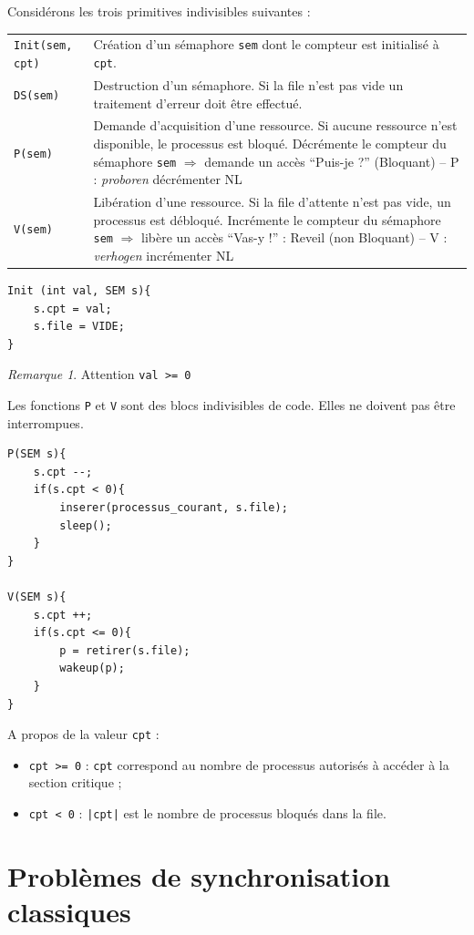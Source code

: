 \documentclass[11pt,english,french]{scrreprt}
\theoremstyle{remark}
\newtheorem*{rem*}{Remarque}
\theoremstyle{definition}
\begin{document}
Considérons les trois primitives indivisibles suivantes :

\begin{tabularx}{\linewidth}{lX}
	\lstinline!Init(sem, cpt)! & Création d'un sémaphore \lstinline!sem! dont le compteur est initialisé à \lstinline!cpt!.\\
	\lstinline!DS(sem)! & Destruction d'un sémaphore. Si la file n'est pas vide un traitement d'erreur doit être effectué.\\
	\lstinline!P(sem)! & Demande d'acquisition d'une ressource. Si aucune ressource n'est disponible, le processus est bloqué. Décrémente le compteur du sémaphore \lstinline!sem! $\Rightarrow$ demande un accès ``Puis-je ?'' (Bloquant) -- P : \emph{proboren} décrémenter NL\\
	\lstinline!V(sem)! & Libération d'une ressource. Si la file d'attente n'est pas vide, un processus est débloqué. Incrémente le compteur du sémaphore \lstinline!sem! $\Rightarrow$ libère un accès ``Vas-y !'' :  Reveil (non Bloquant) -- V : \emph{verhogen} incrémenter NL\\
\end{tabularx}

\begin{lstlisting}
Init (int val, SEM s){
	s.cpt = val;
	s.file = VIDE;
}
\end{lstlisting}
\begin{rem*}
	Attention \lstinline!val >= 0!
\end{rem*}

Les fonctions \lstinline!P! et \lstinline!V! sont des blocs indivisibles de code. Elles ne doivent pas être interrompues.
\begin{lstlisting}[multicols=2, tabsize=4]
P(SEM s){
	s.cpt --;
	if(s.cpt < 0){
		inserer(processus_courant, s.file);
		sleep();
	}
}

V(SEM s){
	s.cpt ++;
	if(s.cpt <= 0){
		p = retirer(s.file);
		wakeup(p);
	}
}
\end{lstlisting}

A propos de la valeur \lstinline!cpt! :\begin{itemize}
	\item \lstinline!cpt >= 0! : \lstinline!cpt! correspond au nombre de processus autorisés à accéder à la section critique ;
	\item \lstinline!cpt < 0! : \lstinline!|cpt|! est le nombre de processus bloqués dans la file.
\end{itemize}

\section{Problèmes de synchronisation classiques}
\end{document}
